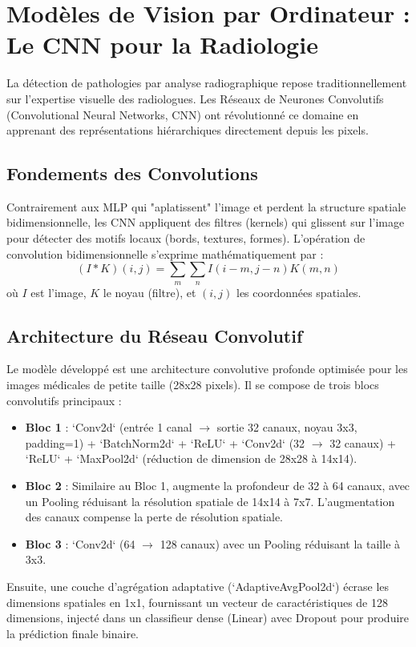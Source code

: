 \documentclass[a4paper,12pt]{report}
\begin{document}
\chapter{Modèles de Vision par Ordinateur : Le CNN pour la Radiologie}

La détection de pathologies par analyse radiographique repose traditionnellement sur l'expertise visuelle des radiologues. Les Réseaux de Neurones Convolutifs (Convolutional Neural Networks, CNN) ont révolutionné ce domaine en apprenant des représentations hiérarchiques directement depuis les pixels.

\section{Fondements des Convolutions}
Contrairement aux MLP qui "aplatissent" l'image et perdent la structure spatiale bidimensionnelle, les CNN appliquent des filtres (kernels) qui glissent sur l'image pour détecter des motifs locaux (bords, textures, formes).
L'opération de convolution bidimensionnelle s'exprime mathématiquement par :
\begin{equation}
(I * K)(i, j) = \sum_{m} \sum_{n} I(i-m, j-n) K(m, n)
\end{equation}
où $I$ est l'image, $K$ le noyau (filtre), et $(i,j)$ les coordonnées spatiales.

\section{Architecture du Réseau Convolutif}
Le modèle développé est une architecture convolutive profonde optimisée pour les images médicales de petite taille (28x28 pixels). Il se compose de trois blocs convolutifs principaux :

\begin{itemize}
    \item \textbf{Bloc 1} : `Conv2d` (entrée 1 canal $\rightarrow$ sortie 32 canaux, noyau 3x3, padding=1) + `BatchNorm2d` + `ReLU` + `Conv2d` (32 $\rightarrow$ 32 canaux) + `ReLU` + `MaxPool2d` (réduction de dimension de 28x28 à 14x14).
    \item \textbf{Bloc 2} : Similaire au Bloc 1, augmente la profondeur de 32 à 64 canaux, avec un Pooling réduisant la résolution spatiale de 14x14 à 7x7. L'augmentation des canaux compense la perte de résolution spatiale.
    \item \textbf{Bloc 3} : `Conv2d` (64 $\rightarrow$ 128 canaux) avec un Pooling réduisant la taille à 3x3.
\end{itemize}
Ensuite, une couche d'agrégation adaptative (`AdaptiveAvgPool2d`) écrase les dimensions spatiales en 1x1, fournissant un vecteur de caractéristiques de 128 dimensions, injecté dans un classifieur dense (Linear) avec Dropout pour produire la prédiction finale binaire.
\end{document}
